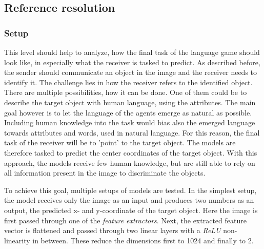 \subsection{Reference resolution}
\label{sec:reference_resolution}
\subsubsection*{Setup}

This level should help to analyze, how the final task of the language game should look like, in especially what the receiver is tasked to predict.
As described before, the sender should communicate an object in the image and the receiver needs to identify it.
The challenge lies in how the receiver refers to the identified object.
There are multiple possibilities, how it can be done.
One of them could be to describe the target object with human language, using the attributes.
The main goal however is to let the language of the agents emerge as natural as possible.
Including human knowledge into the task would bias also the emerged language towards attributes and words, used in natural language.
For this reason, the final task of the receiver will be to 'point' to the target object.
The models are therefore tasked to predict the center coordinates of the target object.
With this approach, the models receive few human knowledge, but are still able to rely on all information present in the image to discriminate the objects.

To achieve this goal, multiple setups of models are tested.
In the simplest setup, the model receives only the image  as an input and produces two numbers as an output, the predicted x- and y-coordinate of the target object.
Here the image is first passed through one of the \emph{feature extractors}.
Next, the extracted feature vector is flattened and passed through two linear layers with a \emph{ReLU} non-linearity in between.
These reduce the dimensions first to 1024 and finally to 2.


